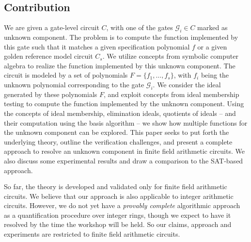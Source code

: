 \subsection{Contribution}
We are given a gate-level circuit $C$, with one of the gates
$\mathcal{G}_i \in C$ marked as unknown component. The problem is to
compute the function implemented by this gate such that it matches a
given specification polynomial $f$ or a given golden reference model
circuit $C_s$. We utilize concepts from symbolic computer algebra to
realize the function implemented by this unknown component. The
circuit is modeled by a set of polynomials $F=\{f_1,\dots,f_s\}$, with
$f_i$ being the unknown polynomial corresponding to the gate
$\mathcal{G}_i$. 
We consider the ideal generated by these polynomials $F$, and exploit
concepts from ideal membership testing to 
compute the function implemented by the unknown component.
Using the concepts of ideal membership, elimination ideals,
quotients of ideals -- and their computation using the \Grobner basis 
algorithm -- we show how multiple functions for the unknown component
can be explored.
This paper seeks to put forth the underlying theory, outline the
verification challenges, and present a complete approach to resolve an
unknown component in finite field arithmetic circuits. We also discuss
some experimental results and draw a comparison to the SAT-based
approach.    

So far, the theory is developed and validated only for finite field
arithmetic circuits. We believe that our approach is also
applicable to integer arithmetic circuits. However, we do not yet have a
{\it provably complete} algorithmic approach as a quantification
procedure over integer rings, though we expect to have it resolved
by the time the workshop will be held. So our claims, approach and
experiments are restricted to finite field arithmetic circuits. 

